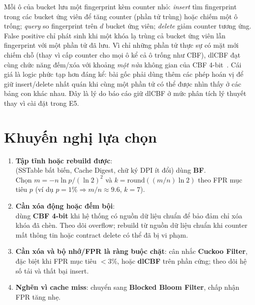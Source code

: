 \documentclass[11pt,a4paper]{article}
\begin{document}
Mỗi ô của bucket lưu một fingerprint kèm counter nhỏ: \emph{insert} tìm
fingerprint trong các bucket ứng viên để tăng counter (phần tử trùng) hoặc
chiếm một ô trống; \emph{query} so fingerprint trên $d$ bucket ứng viên;
\emph{delete} giảm counter tương ứng. False positive chỉ phát sinh khi một
khóa lạ trùng cả bucket ứng viên lẫn fingerprint với một phần tử đã lưu.
Vì chỉ những phần tử thực sự có mặt mới chiếm chỗ (thay vì cấp counter
cho mọi ô kể cả ô trống như CBF), dlCBF đạt cùng chức năng đếm/xóa với
khoảng \emph{một nửa} không gian của CBF 4-bit~\cite{bonomi2006}. Cái giá
là logic phức tạp hơn đáng kể: bài gốc phải dùng thêm các phép hoán vị để
giữ insert/delete nhất quán khi cùng một phần tử có thể được nhìn thấy ở
các bảng con khác nhau. Đây là lý do báo cáo giữ dlCBF ở mức phân tích lý
thuyết thay vì cài đặt trong E5.

\section{Khuyến nghị lựa chọn}
\label{sec:recommend}
\begin{enumerate}
  \item \textbf{Tập tĩnh hoặc rebuild được}:\\
        (SSTable bất biến, Cache Digest, chữ ký DPI ít đổi) dùng \textbf{BF}.\\
        Chọn $m=-n\ln p/(\ln 2)^2$ và
        $k=\mathrm{round}((m/n)\ln 2)$ theo FPR mục
        tiêu $p$ (ví dụ $p=1\%\Rightarrow m/n\approx 9.6$, $k=7$).
  \item \textbf{Cần xóa động hoặc đếm bội}:\\ dùng \textbf{CBF 4-bit} khi hệ
        thống có nguồn dữ liệu chuẩn để bảo đảm chỉ xóa khóa đã chèn. Theo dõi
        overflow; rebuild từ nguồn dữ liệu chuẩn khi counter mất thông tin hoặc
        contract delete có thể đã bị vi phạm.
  \item \textbf{Cần xóa và bộ nhớ/FPR là ràng buộc chặt}: cân nhắc
        \textbf{Cuckoo Filter}, đặc biệt khi FPR mục tiêu $<3\%$, hoặc
        \textbf{dlCBF} trên phần cứng; theo dõi hệ số tải và thất bại insert.
  \item \textbf{Nghẽn vì cache miss}: chuyển sang \textbf{Blocked Bloom
        Filter}, chấp nhận FPR tăng nhẹ.
\end{enumerate}
\end{document}
